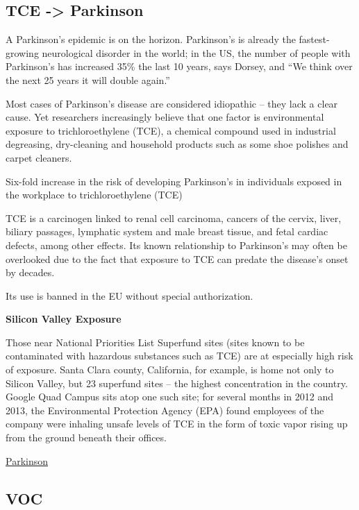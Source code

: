\documentclass[
]{book}
\begin{document}
\hypertarget{tce---parkinson}{%
\subsection{TCE -\textgreater{} Parkinson}\label{tce---parkinson}}

A Parkinson's epidemic is on the horizon. Parkinson's is already the fastest-growing neurological disorder in the world; in the US, the number of people with Parkinson's has increased 35\% the last 10 years, says Dorsey, and ``We think over the next 25 years it will double again.''

Most cases of Parkinson's disease are considered idiopathic -- they lack a clear cause. Yet researchers increasingly believe that one factor is environmental exposure to trichloroethylene (TCE), a chemical compound used in industrial degreasing, dry-cleaning and household products such as some shoe polishes and carpet cleaners.

Six-fold increase in the risk of developing Parkinson's in individuals exposed in the workplace to trichloroethylene (TCE)

TCE is a carcinogen linked to renal cell carcinoma, cancers of the cervix, liver, biliary passages, lymphatic system and male breast tissue, and fetal cardiac defects, among other effects. Its known relationship to Parkinson's may often be overlooked due to the fact that exposure to TCE can predate the disease's onset by decades.

Its use is banned in the EU without special authorization.

\textbf{Silicon Valley Exposure}

Those near National Priorities List Superfund sites (sites known to be contaminated with hazardous substances such as TCE) are at especially high risk of exposure. Santa Clara county, California, for example, is home not only to Silicon Valley, but 23 superfund sites -- the highest concentration in the country. Google Quad Campus sits atop one such site; for several months in 2012 and 2013, the Environmental Protection Agency (EPA) found employees of the company were inhaling unsafe levels of TCE in the form of toxic vapor rising up from the ground beneath their offices.

\href{https://www.theguardian.com/commentisfree/2021/apr/07/rates-of-parkinsons-disease-are-exploding-a-common-chemical-may-be-to-blame}{Parkinson}

\hypertarget{voc}{%
\subsection{VOC}\label{voc}}
\end{document}
